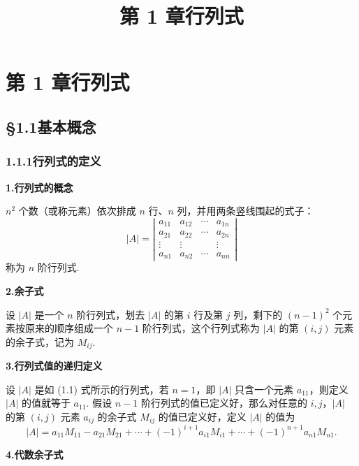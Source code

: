 \documentclass[UTF8,12pt,a4paper,fontset=fandol]{ctexart}
\title{第 1 章\quad 行列式}
\author{}
\date{}
\begin{document}
\maketitle

\section*{第 1 章\quad 行列式}

\subsection*{§1.1\quad 基本概念}

\subsubsection*{1.1.1\quad 行列式的定义}

\noindent\textbf{1.\quad 行列式的概念}

$n^2$ 个数（或称元素）依次排成 $n$ 行、$n$ 列，并用两条竖线围起的式子：
\begin{equation}
|A|=
\left|\begin{array}{cccc}
a_{11} & a_{12} & \cdots & a_{1n}\\
a_{21} & a_{22} & \cdots & a_{2n}\\
\vdots & \vdots &        & \vdots\\
a_{n1} & a_{n2} & \cdots & a_{nn}
\end{array}\right|
\tag{1.1}
\end{equation}
称为 $n$ 阶行列式.

\noindent\textbf{2.\quad 余子式}

设 $|A|$ 是一个 $n$ 阶行列式，划去 $|A|$ 的第 $i$ 行及第 $j$ 列，剩下的 $(n-1)^2$ 个元素按原来的顺序组成一个 $n-1$ 阶行列式，这个行列式称为 $|A|$ 的第 $(i,j)$ 元素的余子式，记为 $M_{ij}$.

\noindent\textbf{3.\quad 行列式值的递归定义}

设 $|A|$ 是如 (1.1) 式所示的行列式，若 $n=1$，即 $|A|$ 只含一个元素 $a_{11}$，则定义 $|A|$ 的值就等于 $a_{11}$. 假设 $n-1$ 阶行列式的值已定义好，那么对任意的 $i,j$，$|A|$ 的第 $(i,j)$ 元素 $a_{ij}$ 的余子式 $M_{ij}$ 的值已定义好，定义 $|A|$ 的值为
\begin{equation}
|A|=a_{11}M_{11}-a_{21}M_{21}+\cdots+(-1)^{i+1}a_{i1}M_{i1}
+\cdots+(-1)^{n+1}a_{n1}M_{n1}.
\tag{1.2}
\end{equation}

\noindent\textbf{4.\quad 代数余子式}
\end{document}
